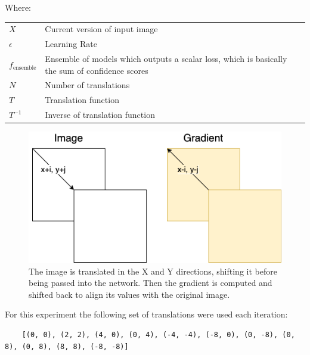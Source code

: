 \documentclass{article}
\begin{document}
Where:
\vspace{0.5cm}

\begin{tabular}{l l}
    $X$ & Current version of input image \\
    $\epsilon$ & Learning Rate \\
    $f_{\text{ensemble}}$ & Ensemble of models which outputs a scalar loss, which is basically the sum of confidence scores \\
    $N$ & Number of translations \\
    $T$ & Translation function \\
    $T^{-1}$ & Inverse of translation function \\[1cm]
\end{tabular}

\begin{figure}
\centering
\includegraphics[width=0.5\linewidth]{images/translation-invariance.png}
\caption{The image is translated in the X and Y directions, shifting it before being passed into the network. Then the gradient is computed and shifted back to align its values with the original image.}
\label{fig:translationInvariance}
\end{figure}

For this experiment the following set of translations were used each iteration:

\begin{verbatim}
    [(0, 0), (2, 2), (4, 0), (0, 4), (-4, -4), (-8, 0), (0, -8), (0, 8), (0, 8), (8, 8), (-8, -8)]
\end{verbatim}
\end{document}
